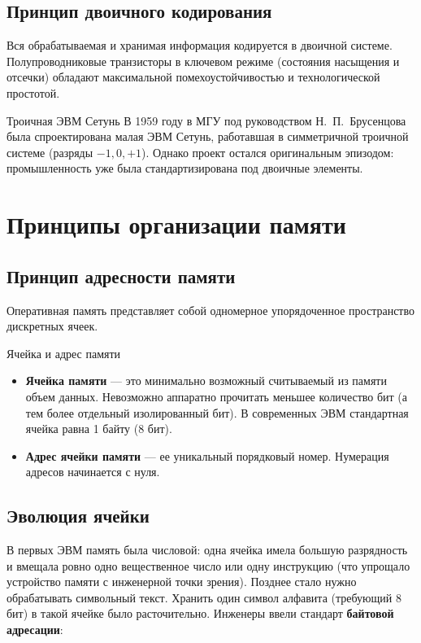 \documentclass[11pt,a4paper]{article}
\begin{document}
\subsection{Принцип двоичного кодирования}
Вся обрабатываемая и хранимая информация кодируется в двоичной системе. Полупроводниковые транзисторы в ключевом режиме (состояния насыщения и отсечки) обладают максимальной помехоустойчивостью и технологической простотой.

\begin{infobox}{Троичная ЭВМ \guillemotleft Сетунь\guillemotright}
В 1959 году в МГУ под руководством Н.~П.~Брусенцова была спроектирована малая ЭВМ \guillemotleft Сетунь\guillemotright, работавшая в симметричной троичной системе (разряды $-1, 0, +1$). 
Однако проект остался оригинальным эпизодом: промышленность уже была стандартизирована под двоичные элементы.
\end{infobox}

\section{Принципы организации памяти}

\subsection{Принцип адресности памяти}
Оперативная память представляет собой одномерное упорядоченное пространство дискретных ячеек.

\begin{definitionbox}{Ячейка и адрес памяти}
\begin{itemize}
    \item \textbf{Ячейка памяти} --- это минимально возможный считываемый из памяти объем данных. Невозможно аппаратно прочитать меньшее количество бит (а тем более отдельный изолированный бит). В современных ЭВМ стандартная ячейка равна 1 байту (8 бит).
    \item \textbf{Адрес ячейки памяти} --- ее уникальный порядковый номер. Нумерация адресов начинается с нуля.
\end{itemize}
\end{definitionbox}

\subsection{Эволюция ячейки}
В первых ЭВМ память была числовой: одна ячейка имела большую разрядность и вмещала ровно одно вещественное число или одну инструкцию (что упрощало устройство памяти с инженерной точки зрения). Позднее стало нужно обрабатывать символьный текст. Хранить один символ алфавита (требующий 8 бит) в такой ячейке было расточительно. Инженеры ввели стандарт \textbf{байтовой адресации}:
\end{document}
